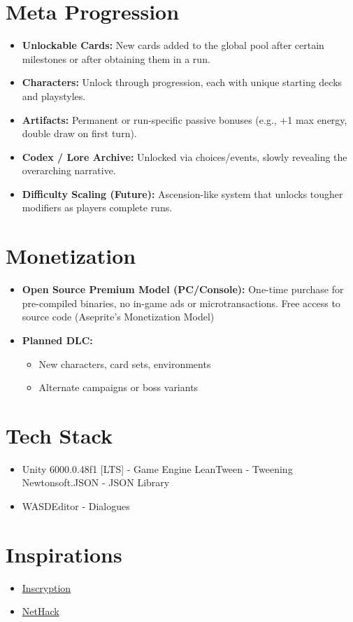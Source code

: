 \documentclass[10pt, a4paper]{article}
\begin{document}
	\section{Meta Progression}
	
	\begin{itemize}
		\item \textbf{Unlockable Cards:} New cards added to the global pool after certain milestones or after obtaining them in a run.
		
		\item \textbf{Characters:} Unlock through progression, each with unique starting decks and playstyles.
		
		\item \textbf{Artifacts:} Permanent or run-specific passive bonuses (e.g., +1 max energy, double draw on first turn).
		
		\item \textbf{Codex / Lore Archive:} Unlocked via choices/events, slowly revealing the overarching narrative.
		
		\item \textbf{Difficulty Scaling (Future):} Ascension-like system that unlocks tougher modifiers as players complete runs.
	\end{itemize}
	\section{Monetization}
	
	\begin{itemize}
		\item \textbf{Open Source Premium Model (PC/Console):} One-time purchase for pre-compiled binaries, no in-game ads or microtransactions. Free access to source code (Aseprite's Monetization Model)
		
		\item \textbf{Planned DLC:}
		\begin{itemize}
			\item New characters, card sets, environments
			\item Alternate campaigns or boss variants
		\end{itemize}
	\end{itemize}
	
	\section{Tech Stack}
		\begin{itemize}
			\item Unity 6000.0.48f1 [LTS] - Game Engine
			\subitem LeanTween - Tweening
			\subitem Newtonsoft.JSON - JSON Library
			\item WASDEditor - Dialogues
		\end{itemize}
	\section{Inspirations}
	\begin{itemize}
		\item \href{https://www.inscryption.com}{Inscryption}
		\item \href{https://www.nethack.org}{NetHack}
	\end{itemize}
\end{document}
